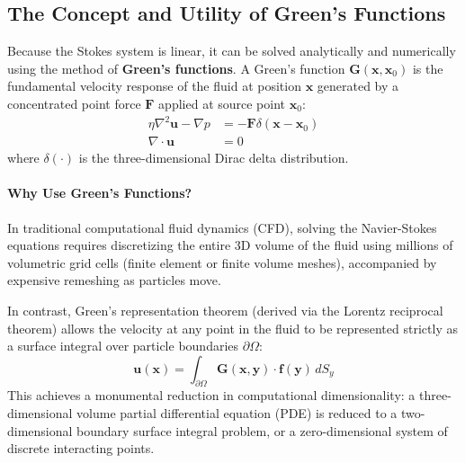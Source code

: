 \documentclass[11pt,a4paper]{article}
\begin{document}
\subsection{The Concept and Utility of Green's Functions}
Because the Stokes system is linear, it can be solved analytically and numerically using the method of \textbf{Green's functions}. A Green's function $\mathbf{G}(\mathbf{x}, \mathbf{x}_0)$ is the fundamental velocity response of the fluid at position $\mathbf{x}$ generated by a concentrated point force $\mathbf{F}$ applied at source point $\mathbf{x}_0$:
\begin{align}
    \eta \nabla^2 \mathbf{u} - \nabla p &= -\mathbf{F} \delta(\mathbf{x} - \mathbf{x}_0) \\
    \nabla \cdot \mathbf{u} &= 0
\end{align}
where $\delta(\cdot)$ is the three-dimensional Dirac delta distribution.

\paragraph{Why Use Green's Functions?}
In traditional computational fluid dynamics (CFD), solving the Navier-Stokes equations requires discretizing the entire 3D volume of the fluid using millions of volumetric grid cells (finite element or finite volume meshes), accompanied by expensive remeshing as particles move. 

In contrast, Green's representation theorem (derived via the Lorentz reciprocal theorem) allows the velocity at any point in the fluid to be represented strictly as a surface integral over particle boundaries $\partial \Omega$:
\begin{equation}
    \mathbf{u}(\mathbf{x}) = \int_{\partial \Omega} \mathbf{G}(\mathbf{x}, \mathbf{y}) \cdot \mathbf{f}(\mathbf{y}) \, dS_y
\end{equation}
This achieves a monumental reduction in computational dimensionality: a three-dimensional volume partial differential equation (PDE) is reduced to a two-dimensional boundary surface integral problem, or a zero-dimensional system of discrete interacting points.
\end{document}
